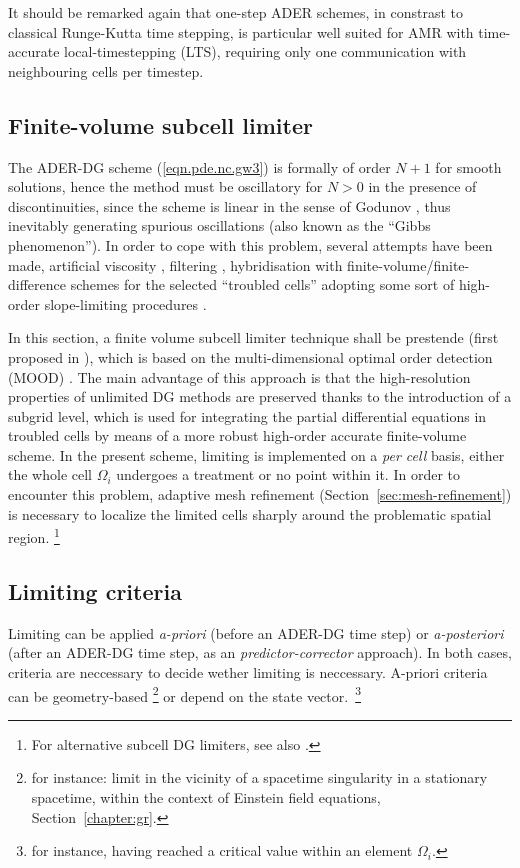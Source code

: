 It should be remarked again that one-step ADER schemes, in constrast to
classical Runge-Kutta time stepping, is particular well suited for AMR
with time-accurate local-timestepping (LTS), requiring only one communication
with neighbouring cells per timestep.

\subsection{Finite-volume subcell limiter}\label{sec:limiter}

The ADER-DG scheme (\ref{eqn.pde.nc.gw3}) is formally of order $N+1$ for
smooth solutions, hence the method must be {oscillatory} for $N>0$ in the
presence of discontinuities, since the scheme is {linear} in the sense of
Godunov \cite{Godunov59}, thus inevitably generating spurious oscillations
(also known as the {``Gibbs phenomenon''}).
In order to cope with this problem, several
attempts have been made, \eg artificial viscosity
\cite{Hartman2002,Persson2006,Feistauer2013}, filtering \cite{Radice2011},
hybridisation with finite-volume/finite-difference schemes for the
selected {``troubled cells''} adopting some sort of high-order
slope-limiting procedures \cite{Cockburn1998, Qiu2004, Qiu2005, 
	Balsara2007,
	Zhu2008, Zhu2013, Luo2007, krivodonova_2007_lho}.

In this section, a finite volume subcell limiter technique shall be
prestende (first proposed in \cite{Dumbser2014}), which is based on the
multi-dimensional optimal order detection (MOOD)
\cite{Clain2011,Diot2013}. 
The main advantage of this approach is that the
high-resolution properties of unlimited DG methods are preserved thanks
to the introduction of a {subgrid level}, which is used
for integrating the partial differential equations in troubled cells by
means of a more robust high-order accurate finite-volume scheme. In the present
scheme, limiting is implemented on a \emph{per cell} basis, \ie either the
whole cell $\Omega_i$ undergoes a  treatment or no point within it. In order
to encounter this problem, adaptive mesh refinement 
(Section~\ref{sec:mesh-refinement}) is necessary to localize the limited cells
sharply around the problematic spatial region.
\footnote{
 For alternative subcell DG limiters, see also \cite{Casoni2013,
  Sonntag2014,Sonntag2017, Fechter2015, Meister2016}.
}

\subsection*{Limiting criteria}
Limiting can be applied \emph{a-priori} (before an ADER-DG time step) or 
\emph{a-poster\-iori}
(after an ADER-DG time step, as an \emph{predictor-corrector} approach). In both
cases, criteria are neccessary to decide wether limiting is neccessary. A-priori
criteria can be geometry-based
\footnote{for instance: limit in the vicinity of a spacetime singularity in a
 stationary spacetime, within the context of Einstein field equations, Section~\ref{chapter:gr}.}
or depend on the state vector.~\footnote{for instance, having reached a critical value
within an element $\Omega_i$.}

